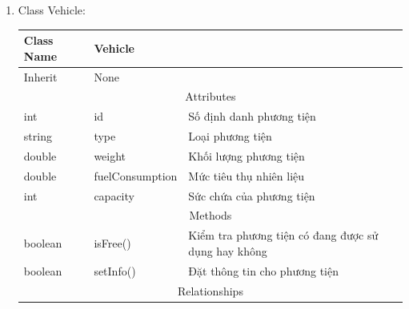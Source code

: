 \begin{enumerate}
           
        \item Class Vehicle:
        \begin{table}[htp]
            \begin{tabular}{|lll|}
                \hline
                \multicolumn{1}{|l|}{Class Name} & \multicolumn{2}{l|}{Vehicle}                                                               \\ \hline
                \multicolumn{1}{|l|}{Inherit}    & \multicolumn{2}{l|}{None}                                                                  \\ \hline
                \multicolumn{3}{|c|}{\cellcolor[HTML]{FFFFC7}Attributes}                                                                      \\ \hline
                \multicolumn{1}{|l|}{int}        & \multicolumn{1}{l|}{id}              & Số định danh phương tiện                            \\ \hline
                \multicolumn{1}{|l|}{string}     & \multicolumn{1}{l|}{type}            & Loại phương tiện                                    \\ \hline
                \multicolumn{1}{|l|}{double}     & \multicolumn{1}{l|}{weight}          & Khối lượng phương tiện                              \\ \hline
                \multicolumn{1}{|l|}{double}     & \multicolumn{1}{l|}{fuelConsumption} & Mức tiêu thụ nhiên liệu                             \\ \hline
                \multicolumn{1}{|l|}{int}        & \multicolumn{1}{l|}{capacity}        & Sức chứa của phương tiện                            \\ \hline
                \multicolumn{3}{|c|}{\cellcolor[HTML]{FFFFC7}Methods}                                                                         \\ \hline
                \multicolumn{1}{|l|}{boolean}    & \multicolumn{1}{l|}{isFree()}        & Kiểm tra phương tiện có đang được sử dụng hay không \\ \hline
                \multicolumn{1}{|l|}{boolean}    & \multicolumn{1}{l|}{setInfo()}       & Đặt thông tin cho phương tiện                       \\ \hline
                \multicolumn{3}{|c|}{\cellcolor[HTML]{FFFFC7}Relationships}                                                                   \\ \hline
            \end{tabular}
        \end{table}
           

\end{enumerate}
